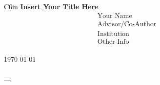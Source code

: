 \begin{center}
\begin{tabular}{C{6in}} 
\huge{\textbf{Insert Your Title Here}}\\
\vspace{0.125in}
$$\begin{matrix}
    \text{Your Name} \\
    \text{Advisor/Co-Author}\\
    \text{Institution}\\
    \text{Other Info}
\end{matrix}$$\\
\today\\
\vspace{0.125in}
\end{tabular}

\begin{tabular}{p{6in}}

\end{tabular}
\clearpage

\begin{tabular}{p{6in}}
    \tableofcontents
\end{tabular}

\clearpage
\end{center}